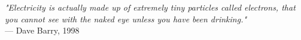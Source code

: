 \begin{flushright}
\emph{"Electricity is actually made up of extremely tiny particles called electrons, that you cannot see with the naked eye unless you have been drinking."}\\
--- Dave Barry, 1998
\end{flushright}